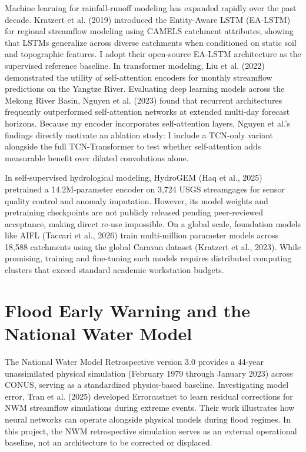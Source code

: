 \documentclass[12pt]{report}
\begin{document}
Machine learning for rainfall-runoff modeling has expanded rapidly over the past decade. Kratzert et al. (2019) introduced the Entity-Aware LSTM (EA-LSTM) for regional streamflow modeling using CAMELS catchment attributes, showing that LSTMs generalize across diverse catchments when conditioned on static soil and topographic features. I adopt their open-source EA-LSTM architecture as the supervised reference baseline. In transformer modeling, Liu et al. (2022) demonstrated the utility of self-attention encoders for monthly streamflow predictions on the Yangtze River. Evaluating deep learning models across the Mekong River Basin, Nguyen et al. (2023) found that recurrent architectures frequently outperformed self-attention networks at extended multi-day forecast horizons. Because my encoder incorporates self-attention layers, Nguyen et al.'s findings directly motivate an ablation study: I include a TCN-only variant alongside the full TCN-Transformer to test whether self-attention adds measurable benefit over dilated convolutions alone.

In self-supervised hydrological modeling, HydroGEM (Haq et al., 2025) pretrained a 14.2M-parameter encoder on 3,724 USGS streamgages for sensor quality control and anomaly imputation. However, its model weights and pretraining checkpoints are not publicly released pending peer-reviewed acceptance, making direct re-use impossible. On a global scale, foundation models like AIFL (Taccari et al., 2026) train multi-million parameter models across 18,588 catchments using the global Caravan dataset (Kratzert et al., 2023). While promising, training and fine-tuning such models requires distributed computing clusters that exceed standard academic workstation budgets.

\section{Flood Early Warning and the National Water Model}

The National Water Model Retrospective version 3.0 provides a 44-year unassimilated physical simulation (February 1979 through January 2023) across CONUS, serving as a standardized physics-based baseline. Investigating model error, Tran et al. (2025) developed Errorcastnet to learn residual corrections for NWM streamflow simulations during extreme events. Their work illustrates how neural networks can operate alongside physical models during flood regimes. In this project, the NWM retrospective simulation serves as an external operational baseline, not an architecture to be corrected or displaced.
\end{document}
